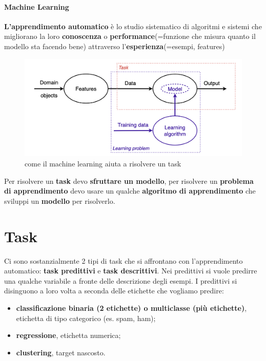 \newpage

\paragraph{Machine Learning} \textbf{L'apprendimento automatico} è lo studio sistematico di algoritmi e sistemi che migliorano la loro \textbf{conoscenza} o \textbf{performance}(=funzione che misura quanto il modello sta facendo bene) attraverso l'\textbf{esperienza}(=esempi, features)

\begin{figure}
    \centering
    \includegraphics[scale=0.5]{images/mlModel.png}
    \caption{come il machine learning aiuta a risolvere un task}
    \label{fig:enter-label}
\end{figure}


Per risolvere un \textbf{task} devo \textbf{sfruttare un modello}, per risolvere un \textbf{problema di apprendimento} devo usare un qualche \textbf{algoritmo di apprendimento} che sviluppi un \textbf{modello} per risolverlo.

\section{Task} Ci sono sostanzialmente 2 tipi di task che si affrontano con l'apprendimento automatico: \textbf{task predittivi}  e \textbf{task descrittivi}. Nei predittivi si vuole predirre una qualche variabile a fronte delle descrizione degli esempi. I predittivi si disinguono a loro volta a seconda delle etichette che vogliamo predire:
\begin{itemize}
    \item \textbf{classificazione binaria (2 etichette) o multiclasse (più etichette)}, etichetta di tipo categorico (es. spam, ham);
    \item \textbf{regressione}, etichetta numerica;
    \item \textbf{clustering}, target nascosto.
\end{itemize}

